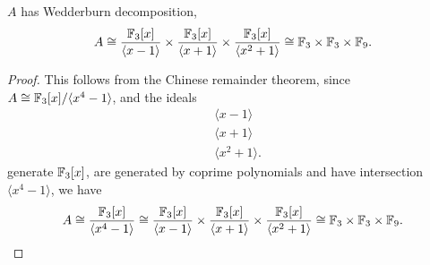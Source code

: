 \documentclass{unswmaths}
\begin{document}
\begin{theorem}
\label{extWeddDecomp}
    $A$ has Wedderburn decomposition,
    \begin{equation*}
        A \cong \frac{{\mathbb{F}_3}[x]}{\langle x-1\rangle}\times\frac{{\mathbb{F}_3}[x]}{\langle x+1\rangle}\times\frac{{\mathbb{F}_3}[x]}{\langle x^2+1\rangle} \cong {\mathbb{F}_3}\times{\mathbb{F}_3}\times\mathbb{F}_9.
    \end{equation*}
\end{theorem}
\begin{proof}
    This follows from the Chinese remainder theorem, since $A\cong {\mathbb{F}_3}[x]/\langle x^4-1\rangle$, and
    the ideals
    \begin{align*}
        &\langle x-1\rangle\\
        &\langle x+1\rangle\\
        &\langle x^2+1\rangle.
    \end{align*}
    generate ${\mathbb{F}_3}[x]$, are generated by coprime polynomials and have intersection $\langle x^4-1\rangle$, we have
    \begin{equation*}
        A \cong \frac{{\mathbb{F}_3}[x]}{\langle x^4-1\rangle} \cong \frac{{\mathbb{F}_3}[x]}{\langle x-1\rangle}\times \frac{{\mathbb{F}_3}[x]}{\langle x+1\rangle}\times\frac{{\mathbb{F}_3}[x]}{\langle x^2+1\rangle} \cong {\mathbb{F}_3}\times{\mathbb{F}_3}\times\mathbb{F}_9.
    \end{equation*}
\end{proof}
\end{document}
